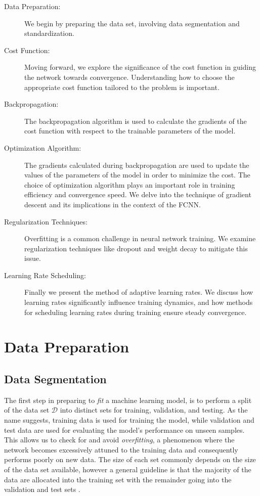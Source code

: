 \documentclass[a4paper, UKenglish, 11pt]{uiomaster}
\begin{document}
\begin{description}
   \item [Data Preparation:] We begin by preparing the data set, involving data segmentation and standardization.

   \item [Cost Function:] Moving forward, we explore the significance of the cost function in guiding the network towards convergence. Understanding how to choose the appropriate cost function tailored to the problem is important.

   \item[Backpropagation:] The backpropagation algorithm is used to calculate the gradients of the cost function with respect to the trainable parameters of the model.

   \item[Optimization Algorithm:] The gradients calculated during backpropagation are used to update the values of the parameters of the model in order to minimize the cost. The choice of optimization algorithm plays an important role in training efficiency and convergence speed. We delve into the technique of gradient descent and its implications in the context of the FCNN.

   \item[Regularization Techniques:] Overfitting is a common challenge in neural network training. We examine regularization techniques like dropout and weight decay to mitigate this issue.

   \item[Learning Rate Scheduling:] Finally we present the method of adaptive learning rates. We discuss how learning rates significantly influence training dynamics, and how methods for scheduling learning rates during training ensure steady convergence.

\end{description}





\section{Data Preparation}

\subsection{Data Segmentation}

The first step in preparing to \emph{fit} a machine learning model, is to perform a split of the data set $\mathcal{D}$ into distinct sets for training, validation, and testing. As the name suggests, training data is used for training the model, while validation and test data are used for evaluating the model's performance on unseen samples. This allows us to check for and avoid \emph{overfitting}, a phenomenon where the network becomes excessively attuned to the training data and consequently performs poorly on new data.
The size of each set commonly depends on the size of the data set available, however a general guideline is that the majority of the data are allocated into the training set with the remainder going into the validation and test sets \cite{mehta2019high}.
\end{document}
